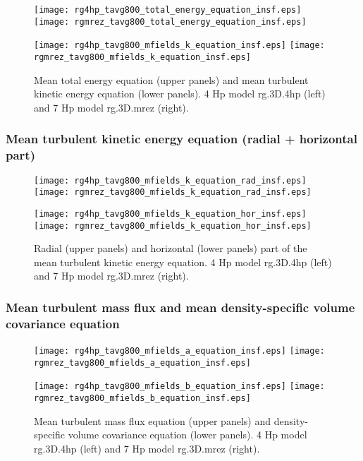 \documentclass[10pt,paper=a4]{report}
\begin{document}
\begin{figure}[!h]
\centerline{
\texttt{[image: rg4hp\_tavg800\_total\_energy\_equation\_insf.eps]}
\texttt{[image: rgmrez\_tavg800\_total\_energy\_equation\_insf.eps]}}

\centerline{
\texttt{[image: rg4hp\_tavg800\_mfields\_k\_equation\_insf.eps]}
\texttt{[image: rgmrez\_tavg800\_mfields\_k\_equation\_insf.eps]}}
\caption{Mean total energy equation (upper panels) and mean turbulent kinetic energy equation (lower panels). 4 Hp model {\sf rg.3D.4hp} (left) and 7 Hp model {\sf rg.3D.mrez} (right).}
\end{figure}

\newpage

\subsubsection{Mean turbulent kinetic energy equation (radial + horizontal part)}

\begin{figure}[!h]
\centerline{
\texttt{[image: rg4hp\_tavg800\_mfields\_k\_equation\_rad\_insf.eps]}
\texttt{[image: rgmrez\_tavg800\_mfields\_k\_equation\_rad\_insf.eps]}}

\centerline{
\texttt{[image: rg4hp\_tavg800\_mfields\_k\_equation\_hor\_insf.eps]}
\texttt{[image: rgmrez\_tavg800\_mfields\_k\_equation\_hor\_insf.eps]}}
\caption{Radial (upper panels) and horizontal (lower panels) part of the mean turbulent kinetic energy equation. 4 Hp model {\sf rg.3D.4hp} (left) and 7 Hp model {\sf rg.3D.mrez} (right).}
\end{figure}

\newpage

\subsubsection{Mean turbulent mass flux and mean density-specific volume covariance equation}

\begin{figure}[!h]
\centerline{
\texttt{[image: rg4hp\_tavg800\_mfields\_a\_equation\_insf.eps]}
\texttt{[image: rgmrez\_tavg800\_mfields\_a\_equation\_insf.eps]}}

\centerline{
\texttt{[image: rg4hp\_tavg800\_mfields\_b\_equation\_insf.eps]}
\texttt{[image: rgmrez\_tavg800\_mfields\_b\_equation\_insf.eps]}}
\caption{Mean turbulent mass flux equation (upper panels) and density-specific volume covariance equation (lower panels). 4 Hp model {\sf rg.3D.4hp} (left) and 7 Hp model {\sf rg.3D.mrez} (right).}
\end{figure}
\end{document}
